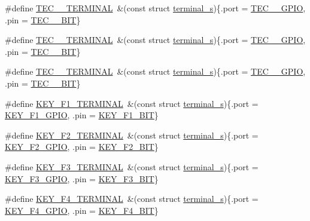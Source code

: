 \begin{DoxyCompactItemize}
\#define \hyperlink{group__hal_gaf57c15d1a0c66122305352e3637026c2}{T\+E\+C\+\_\+\_\+\+T\+E\+R\+M\+I\+N\+AL}~\&(const struct \hyperlink{structterminal__s}{terminal\+\_\+s})\{.port = \hyperlink{group__samples_ga83ce1f0ab51ee7b4df55e629cdfc52d9}{T\+E\+C\+\_\+\_\+\+G\+P\+IO}, .pin = \hyperlink{group__samples_gaed7549a304721e36693036c8a289ff4c}{T\+E\+C\+\_\+\_\+\+B\+IT}\}
\item 
\#define \hyperlink{group__hal_ga9f8f74ae7816a025d02645ae892d1126}{T\+E\+C\+\_\+\_\+\+T\+E\+R\+M\+I\+N\+AL}~\&(const struct \hyperlink{structterminal__s}{terminal\+\_\+s})\{.port = \hyperlink{group__samples_gae8728c8f2e4279383925ff93a183b407}{T\+E\+C\+\_\+\_\+\+G\+P\+IO}, .pin = \hyperlink{group__samples_ga64392cf03fba776f8a9dc238e25ec184}{T\+E\+C\+\_\+\_\+\+B\+IT}\}
\item 
\#define \hyperlink{group__hal_gabc104deb091e5ee6be6445dbd2c5d1ae}{T\+E\+C\+\_\+\_\+\+T\+E\+R\+M\+I\+N\+AL}~\&(const struct \hyperlink{structterminal__s}{terminal\+\_\+s})\{.port = \hyperlink{group__samples_gaa5418f15596d7ada110c4105aa70e561}{T\+E\+C\+\_\+\_\+\+G\+P\+IO}, .pin = \hyperlink{group__samples_gac7c8a49f0602d0aeee33923ce8708a4b}{T\+E\+C\+\_\+\_\+\+B\+IT}\}
\item 
\#define \hyperlink{group__hal_ga5626e4124830d632401a45cef41ab012}{K\+E\+Y\+\_\+\+F1\+\_\+\+T\+E\+R\+M\+I\+N\+AL}~\&(const struct \hyperlink{structterminal__s}{terminal\+\_\+s})\{.port = \hyperlink{group__hal_ga5ca4d37214720b82e845407c6fa2347a}{K\+E\+Y\+\_\+\+F1\+\_\+\+G\+P\+IO}, .pin = \hyperlink{group__hal_gaa5e208d84a752a40a307c23236dc60e2}{K\+E\+Y\+\_\+\+F1\+\_\+\+B\+IT}\}
\item 
\#define \hyperlink{group__hal_ga7ff86388200bb3989273fc3b0dc138b2}{K\+E\+Y\+\_\+\+F2\+\_\+\+T\+E\+R\+M\+I\+N\+AL}~\&(const struct \hyperlink{structterminal__s}{terminal\+\_\+s})\{.port = \hyperlink{group__hal_ga84995a20a536edfbc062b220c761768e}{K\+E\+Y\+\_\+\+F2\+\_\+\+G\+P\+IO}, .pin = \hyperlink{group__hal_gaa1529bc5c7a8cc9c0221078f2425eed8}{K\+E\+Y\+\_\+\+F2\+\_\+\+B\+IT}\}
\item 
\#define \hyperlink{group__hal_ga407d2cd21ce7ba2bca291fa83db88c6e}{K\+E\+Y\+\_\+\+F3\+\_\+\+T\+E\+R\+M\+I\+N\+AL}~\&(const struct \hyperlink{structterminal__s}{terminal\+\_\+s})\{.port = \hyperlink{group__hal_gac7de7a3e791e70cb61e1ba74c23fd8f3}{K\+E\+Y\+\_\+\+F3\+\_\+\+G\+P\+IO}, .pin = \hyperlink{group__hal_ga0b750ff71397168903bb9406b4a0bc43}{K\+E\+Y\+\_\+\+F3\+\_\+\+B\+IT}\}
\item 
\#define \hyperlink{group__hal_ga88e24403963b95f3056acd51ba585d78}{K\+E\+Y\+\_\+\+F4\+\_\+\+T\+E\+R\+M\+I\+N\+AL}~\&(const struct \hyperlink{structterminal__s}{terminal\+\_\+s})\{.port = \hyperlink{group__hal_gabc1b6065dd7a4f9e7c7eb492f7d3d548}{K\+E\+Y\+\_\+\+F4\+\_\+\+G\+P\+IO}, .pin = \hyperlink{group__hal_gadd1233da3fb79555176e60c1433f5d2c}{K\+E\+Y\+\_\+\+F4\+\_\+\+B\+IT}\}

\end{DoxyCompactItemize}
